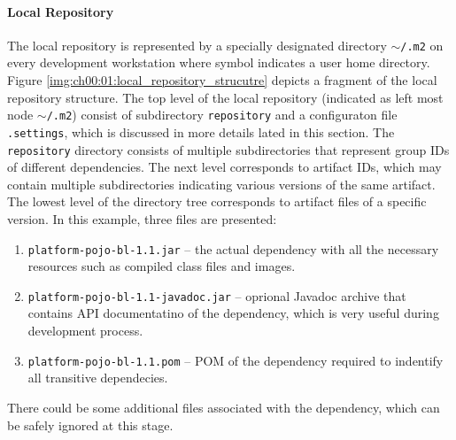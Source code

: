   \paragraph*{Local Repository}
  The local repository is represented by a specially designated directory \texttt{$\sim$/.m2} on every development workstation where symbol \tikzinline{$\sim$} indicates a user home directory.
  Figure \ref{img:ch00:01:local_repository_strucutre} depicts a fragment of the local repository structure.
  The top level of the local repository (indicated as left most node \texttt{$\sim$/.m2}) consist of subdirectory \texttt{repository} and a configuraton file \texttt{.settings}, which is discussed in more details lated in this section.
  The \texttt{repository} directory consists of multiple subdirectories that represent group IDs of different dependencies.
  The next level corresponds to artifact IDs, which may contain multiple subdirectories indicating various versions of the same artifact.
  The lowest level of the directory tree corresponds to artifact files of a specific version.
  In this example, three files are presented:
  \begin{enumerate}
    \item \texttt{platform-pojo-bl-1.1.jar} -- the actual dependency with all the necessary resources such as compiled class files and images.
    \item \texttt{platform-pojo-bl-1.1-javadoc.jar} -- oprional Javadoc archive that contains API documentatino of the dependency, which is very useful during development process.
    \item \texttt{platform-pojo-bl-1.1.pom} -- POM of the dependency required to indentify all transitive dependecies.
  \end{enumerate}
  There could be some additional files associated with the dependency, which can be safely ignored at this stage.

